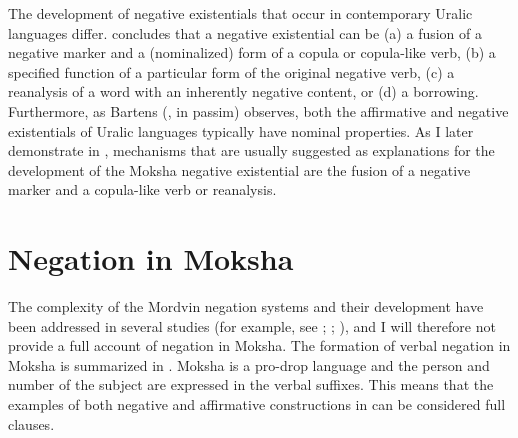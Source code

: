 \documentclass[output=paper,colorlinks,citecolor=brown,draft,draftmode]{langscibook}
\begin{document}
  The development of negative existentials that occur in contemporary Uralic languages differ. \citet[566--567]{Veselinova2015} concludes that a negative existential can be (a) a fusion of a negative marker and a (nominalized) form of a copula or copula-like verb, (b) a specified function of a particular form of the original negative verb, (c) a reanalysis of a word with an inherently negative content, or (d) a borrowing. Furthermore, as Bartens (\citeyear{Bartens1996}, in passim) observes, both the affirmative and negative existentials of Uralic languages typically have nominal properties. As I later demonstrate in , mechanisms that are usually suggested as explanations for the development of the Moksha negative existential are the fusion of a negative marker and a copula-like verb or reanalysis.

\section{Negation in Moksha}\label{sec:2:4}

The complexity of the Mordvin negation systems and their development have been addressed in several studies (for example, see \citealt[140--144]{Bartens1999}; \citealt[87--87]{Keresztes2011}; \citealt{Hamari2007,Hamari2011,Hamari2013}), and I will therefore not provide a full account of negation in Moksha. The formation of verbal negation in Moksha is summarized in . Moksha is a pro-drop language and the person and number of the subject are expressed in the verbal suffixes. This means that the examples of both negative and affirmative constructions in  can be considered full clauses.
\end{document}
